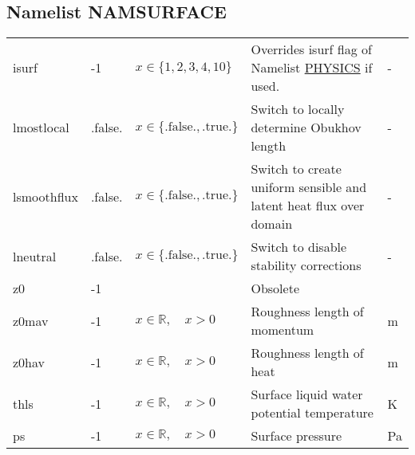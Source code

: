 \documentclass[twoside,11pt,fleqn,a4paper,english,openright]{report}
\begin{document}
\subsection{Namelist NAMSURFACE}\label{par:surface}
\begin{center}
  \tablelasttail{
        &&&&\\\hline
  }
\begin{supertabular}{|l|p{1.6cm}|p{3.5cm}|p{6cm}|l|}
  isurf	& -1	& $x \in \{1,2,3,4,10\}$	& Overrides isurf flag of Namelist \hyperref[par:physics]{PHYSICS} if used. & -\\
  lmostlocal	& .false.	& $x\in\{\text{.false.},\text{.true.}\}$	& Switch to locally determine Obukhov length& -\\
  lsmoothflux	& .false.	& $x\in\{\text{.false.},\text{.true.}\}$	& Switch to create uniform sensible and latent heat flux over domain& -\\
  lneutral	& .false.	& $x\in\{\text{.false.},\text{.true.}\}$	& Switch to disable stability corrections & -\\
  z0	& -1	& 	& Obsolete	& \\
  z0mav	& -1	& $x \in \mathbb{R}, \quad x>0$	& Roughness length of momentum	& m\\
  z0hav	& -1	& $x \in \mathbb{R}, \quad x>0$	& Roughness length of heat	& m\\
  thls	& -1	& $x \in \mathbb{R}, \quad x>0$	& Surface liquid water potential temperature & K\\
  ps	& -1	& $x \in \mathbb{R}, \quad x>0$	& Surface pressure & Pa\\

\end{supertabular}
\end{center}
\end{document}
